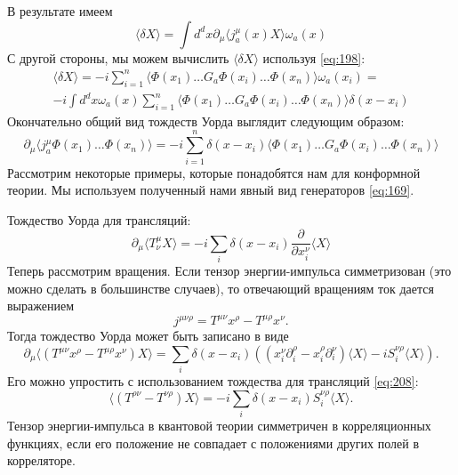 \documentclass[a4paper,12pt]{article}
\theoremstyle{definition}
\theoremstyle{definition}
\theoremstyle{definition}
\begin{document}
В результате имеем
\begin{equation}
  \label{eq:205}
  \langle \delta X\rangle=\int d^{d}x \partial_{\mu}\langle j^{\mu}_{a}(x) X\rangle \omega_{a}(x)
\end{equation}
С другой стороны, мы можем вычислить $\langle\delta X\rangle$ используя \eqref{eq:198}:
\begin{multline}
  \label{eq:206}
  \langle\delta X\rangle=-i\sum_{i=1}^{n}\langle \Phi(x_{1})\dots G_{a} \Phi(x_{i}) \dots \Phi(x_{n})\rangle \omega_{a}(x_{i})=\\
  -i \int d^{d}x \omega_{a}(x) \sum_{i=1}^{n} \langle \Phi(x_{1}) \dots G_{a} \Phi(x_{i}) \dots \Phi(x_{n})\rangle \delta (x-x_{i})
\end{multline}
Окончательно общий вид тождеств Уорда выглядит следующим образом:
\begin{equation}
  \label{eq:207}
  \partial_{\mu}\langle j^{\mu}_{a}\Phi(x_{1}) \dots \Phi(x_{n})\rangle=-i\sum_{i=1}^{n}\delta (x-x_{i}) \langle\Phi(x_{1})\dots G_{a} \Phi(x_{i})\dots \Phi(x_{n})\rangle
\end{equation}
Рассмотрим некоторые примеры, которые понадобятся нам для конформной теории. Мы используем полученный нами явный вид генераторов \eqref{eq:169}.

Тождество Уорда для трансляций:
\begin{equation}
  \label{eq:208}
  \partial_{\mu}\langle T^{\mu}_{\nu} X\rangle =-i \sum_{i} \delta(x-x_{i}) \frac{\partial}{\partial x_{i}^{\nu}} \langle X \rangle
\end{equation}
Теперь рассмотрим вращения. Если тензор энергии-импульса симметризован (это можно сделать в большинстве случаев), то отвечающий вращениям ток дается выражением
\begin{equation}
  \label{eq:209}
  j^{\mu\nu\rho}=T^{\mu\nu}x^{\rho}-T^{\mu\rho}x^{\nu}.
\end{equation}
Тогда тождество Уорда может быть записано в виде
\begin{equation}
  \label{eq:210}
  \partial_{\mu}\langle (T^{\mu\nu}x^{\rho}-T^{\mu\rho}x^{\nu}) X\rangle=\sum_{i }\delta(x-x_{i}) \left( (x^{\nu}_{i}\partial^{\rho}_{i}-x^{\rho}_{i}\partial^{\nu}_{i})\langle X\rangle-i S^{\nu\rho}_{i}\langle X\rangle\right).
\end{equation}
Его можно упростить с использованием тождества для трансляций \eqref{eq:208}:
\begin{equation}
  \label{eq:211}
  \langle (T^{\rho\nu}-T^{\nu\rho}) X\rangle=-i \sum_{i} \delta(x-x_{i}) S^{\nu\rho}_{i}\langle X\rangle.
\end{equation}
Тензор энергии-импульса в квантовой теории симметричен в корреляционных функциях, если его положение не совпадает с положениями других полей в корреляторе. 
\end{document}
